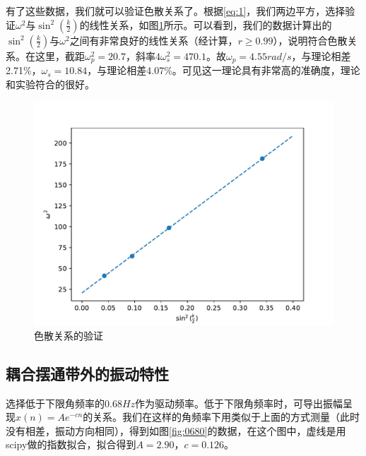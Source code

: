 \documentclass[fleqn,10pt]{SelfArx} %
\begin{document}
有了这些数据，我们就可以验证色散关系了。根据\ref{eq:1}，我们两边平方，选择验证$\omega^2$与$\sin^2(\frac{k}{2})$的线性关系，如图\ref{fig:omegasink}所示。可以看到，我们的数据计算出的$\sin^2(\frac{k}{2})$与$\omega^2$之间有非常良好的线性关系（经计算，$r\geq0.99$），说明符合色散关系。在这里，截距$\omega_p^2=20.7$，斜率$4\omega_s^2=470.1$。故$\omega_p=4.55rad/s$，与理论相差2.71\%，$\omega_s=10.84$，与理论相差4.07\%。可见这一理论具有非常高的准确度，理论和实验符合的很好。

\begin{figure}[htbp]
	\centering
	\includegraphics[width=\linewidth]{sin-omega.pdf}
	\caption{色散关系的验证}
	\label{fig:omegasink}
\end{figure}

\subsection{耦合摆通带外的振动特性}

选择低于下限角频率的$0.68Hz$作为驱动频率。低于下限角频率时，可导出振幅呈现$x(n)=Ae^{-cn}$的关系。我们在这样的角频率下用类似于上面的方式测量（此时没有相差，振动方向相同），得到如图\ref{fig:0680}的数据，在这个图中，虚线是用scipy做的指数拟合，拟合得到$A=2.90$，$c=0.126$。
\end{document}
